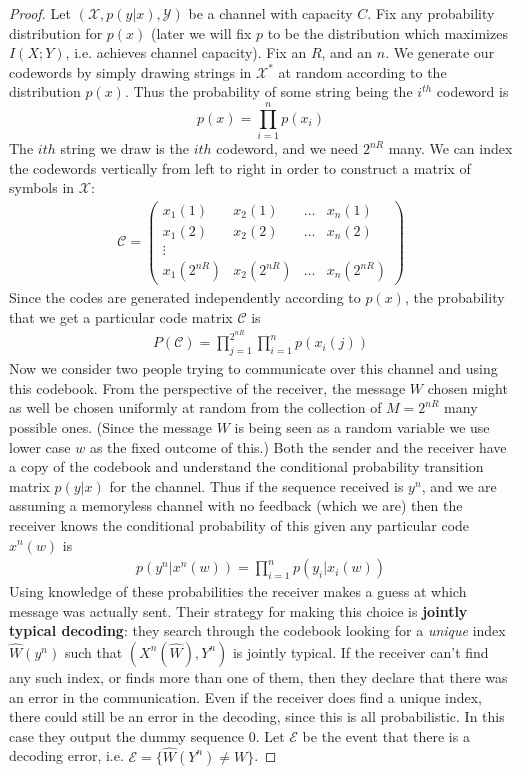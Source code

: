 \documentclass{article}
\theoremstyle{definition}
\theoremstyle{plain}
\begin{document}
\begin{proof}
	Let $(\mathcal{X},p(y|x),\mathcal{Y})$ be a channel with capacity $C$. Fix any probability distribution for $p(x)$ (later we will fix $p$ to be the distribution which maximizes $I(X;Y)$, i.e. achieves channel capacity). Fix an $R$, and an $n$. We generate our codewords by simply drawing strings in $\mathcal{X}^*$ at random according to the distribution $p(x)$. Thus the probability of some string being the $i^{th}$ codeword is 
	\[ p(x) = \prod_{i=1}^n p(x_i) \]
The $i{th}$ string we draw is the $i{th}$ codeword, and we need $2^{nR}$ many. We can index the codewords vertically from left to right in order to construct a matrix of symbols in $\mathcal{X}$:
\begin{align}
	\mathcal{C} = \begin{pmatrix} x_1(1) & x_2(1) & \ldots & x_n(1) 
	\\	x_1(2) & x_2(2) & \ldots & x_n(2) \\
	\vdots \\ x_1(2^{nR}) & x_2(2^{nR}) & \ldots & x_n(2^{nR}) \end{pmatrix}
\end{align}
Since the codes are generated independently according to $p(x)$, the probability that we get a particular code matrix $\mathcal{C}$ is 
\begin{align}
	P(\mathcal{C}) = \prod_{j=1}^{2^{nR}}\prod_{i=1}^np(x_i(j))
\end{align}
Now we consider two people trying to communicate over this channel and using this codebook. From the perspective of the receiver, the message $W$ chosen might as well be chosen uniformly at random from the collection of $M=2^{nR}$ many possible ones. (Since the message $W$ is being seen as a random variable we use lower case $w$ as the fixed outcome of this.) Both the sender and the receiver have a copy of the codebook and understand the conditional probability transition matrix $p(y|x)$ for the channel. Thus if the sequence received is $y^n$, and we are assuming a memoryless channel with no feedback (which we are) then the receiver knows the conditional probability of this given any particular code $x^n(w)$ is 
\begin{align}
	p(y^n|x^n(w)) = \prod_{i=1}^n p(y_i|x_i(w))
\end{align}
Using knowledge of these probabilities the receiver makes a guess at which message was actually sent. Their strategy for making this choice is \textbf{jointly typical decoding}: they search through the codebook looking for a \emph{unique} index $\hat{W}(y^n)$ such that $(X^n(\hat{W}),Y^n)$ is jointly typical. If the receiver can't find any such index, or finds more than one of them, then they declare that there was an error in the communication. Even if the receiver does find a unique index, there could still be an error in the decoding, since this is all probabilistic. In this case they output the dummy sequence $0$. Let $\mathcal{E}$ be the event that there is a decoding error, i.e. $\mathcal{E} = \{\hat{W}(Y^n) \neq W\}$. 

\end{proof}
\end{document}
